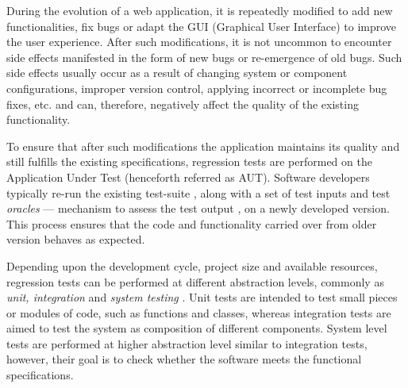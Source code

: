 During the evolution of a web application, it is repeatedly modified to add new functionalities, fix bugs or adapt the GUI (Graphical User Interface) to improve the user experience. After such modifications, it is not uncommon to encounter side effects manifested in the form of new bugs or re-emergence of old bugs. Such side effects usually occur as a result of changing system or component configurations, improper version control, applying incorrect or incomplete bug fixes, etc. and can, therefore, negatively affect the quality of the existing functionality. 

To ensure that after such modifications the application maintains its quality and still fulfills the existing specifications, regression tests are performed on the Application Under Test (henceforth referred as AUT). Software developers typically re-run the existing test-suite \cite{rothermel2001prioritizing}, \cite{elbaum2000prioritizing} along with a set of test inputs and test \textit{oracles} — mechanism to assess the test output \cite{1240304}, on a newly developed version. This process ensures that the code and functionality carried over from older version behaves as expected.

Depending upon the development cycle, project size and available resources, regression tests can be performed at different abstraction levels, commonly as \textit{unit, integration} and \textit{system testing} \cite{Mpezze}. Unit tests are intended to test small pieces or modules of code, such as functions and classes, whereas integration tests are aimed to test the system as composition of different components. System level tests are performed at higher abstraction level similar to integration tests, however, their goal is to check whether the software meets the functional specifications. 

